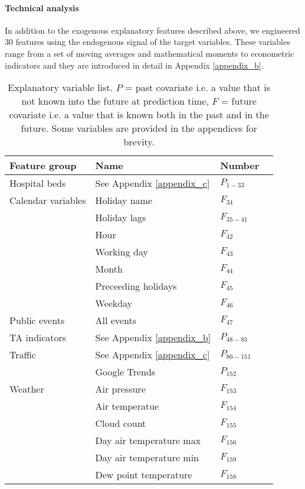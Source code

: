 \paragraph{Technical analysis} In addition to the exogenous explanatory features described above, we engineered 30 features using the endogenous signal of the target variables. These variables range from a set of moving averages and mathematical moments to econometric indicators and they are introduced in detail in Appendix \ref{appendix_b}.

\begin{table}[p]
\centering
	\caption{Explanatory variable list. $P$ = past covariate i.e. a value that is not known into the future at prediction time, $F$ = future covariate i.e. a value that is known both in the past and in the future. Some variables are provided in the appendices for brevity.}
	\label{tab:explanatory_variables}
	\begin{tabular}[t]{ llll }
	\hline
	Feature group & Name & Number \\
	\hline
	Hospital beds & See Appendix \ref{appendix_c} & $P_{1-33}$ \\
	Calendar variables & Holiday name & $F_{34}$ \\
	& Holiday lags & $F_{35-41}$ \\
	& Hour & $F_{42}$ \\
	& Working day & $F_{43}$ \\
	& Month & $F_{44}$ \\
	& Preceeding holidays & $F_{45}$ \\
	& Weekday & $F_{46}$ \\
	Public events & All events & $F_{47}$ \\
	TA indicators & See Appendix \ref{appendix_b} & $P_{48-85}$ \\
	Traffic & See Appendix \ref{appendix_c} & $P_{86-151}$ \\
	& Google Trends & $P_{152}$ \\
	Weather & Air pressure & $F_{153}$ \\
	& Air temperatue & $F_{154}$ \\
	& Cloud count & $F_{155}$ \\
	& Day air temperature max & $F_{156}$ \\
	& Day air temperature min & $F_{159}$ \\
	& Dew point temperature & $F_{158}$ \\

\end{tabular}
\end{table}
